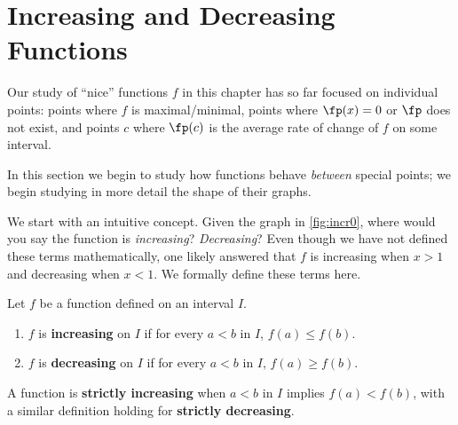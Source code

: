 \section{Increasing and Decreasing Functions}\label{sec:incr_decr}

Our study of ``nice'' functions $f$ in this chapter has so far focused on individual points: points where $f$ is maximal/minimal, points where $\fp(x) = 0$ or $\fp$ does not exist, and points $c$ where $\fp(c)$ is the average rate of change of $f$ on some interval. 

In this section we begin to study how functions behave \textit{between} special points; we begin studying in more detail the shape of their graphs. 


We start with an intuitive concept. Given the graph in \autoref{fig:incr0}, where would you say the function is \textit{increasing}? \textit{Decreasing}? Even though we have not defined these terms mathematically, one likely answered that $f$ is increasing when $x>1$ and decreasing when $x<1$. We formally define these terms here.

{Let $f$ be a function defined on an interval $I$.
\begin{enumerate}
	\item	$f$ is \textbf{increasing} on $I$ if for every $a<b$ in $I$, $f(a) \leq f(b)$.
	\item	$f$ is \textbf{decreasing} on $I$ if for every $a<b$ in $I$, $f(a) \geq f(b)$.
\end{enumerate}
A function is \textbf{strictly increasing} when $a<b$ in $I$ implies $f(a) < f(b)$, with a similar definition holding for \textbf{strictly decreasing}.}

